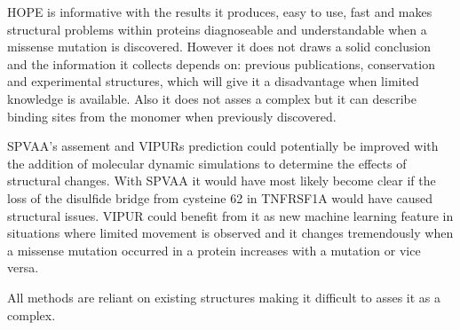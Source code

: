 HOPE is informative with the results it produces, easy to use, fast and makes structural problems within proteins diagnoseable and understandable when a missense mutation is discovered. However it does not draws a solid conclusion and the information it collects depends on: previous publications, conservation and experimental structures, which will give it a disadvantage when limited knowledge is available. Also it does not asses a complex but it can describe binding sites from the monomer when previously discovered.


SPVAA's assement and VIPURs prediction could potentially be improved with the addition of molecular dynamic simulations to determine the effects of structural changes. With SPVAA it would have most likely become clear if the loss of the disulfide bridge from cysteine 62 in TNFRSF1A would have caused structural issues. VIPUR could benefit from it as new machine learning feature in situations where limited movement is observed and it changes tremendously when a missense mutation occurred in a protein increases with a mutation or vice versa.



All methods are reliant on existing structures making it difficult to asses it as a complex.
